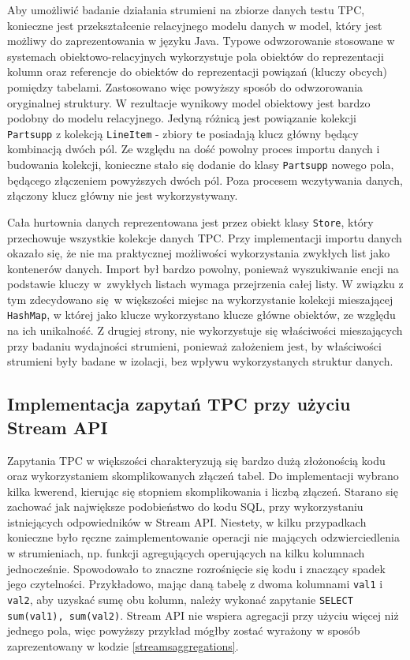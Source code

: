 \documentclass[12pt,twoside,openright]{extarticle}
\begin{document}
    Aby umożliwić badanie działania strumieni na zbiorze danych testu TPC, konieczne jest przekształcenie relacyjnego modelu danych w model, który jest możliwy do zaprezentowania w języku Java. Typowe odwzorowanie stosowane w systemach obiektowo-relacyjnych wykorzystuje pola obiektów do reprezentacji kolumn oraz referencje do obiektów do reprezentacji powiązań (kluczy obcych) pomiędzy tabelami. Zastosowano więc powyższy sposób do odwzorowania oryginalnej struktury. W rezultacje wynikowy model obiektowy jest bardzo podobny do modelu relacyjnego. Jedyną różnicą jest powiązanie kolekcji \texttt{Partsupp} z kolekcją \texttt{LineItem} - zbiory te posiadają klucz główny będący kombinacją dwóch pól. Ze względu na dość powolny proces importu danych i budowania kolekcji, konieczne stało się dodanie do klasy \texttt{Partsupp} nowego pola, będącego złączeniem powyższych dwóch pól. Poza procesem wczytywania danych, złączony klucz główny nie jest wykorzystywany.

    Cała hurtownia danych reprezentowana jest przez obiekt klasy \texttt{Store}, który przechowuje wszystkie kolekcje danych TPC. Przy implementacji importu danych okazało się, że nie ma praktycznej możliwości wykorzystania zwykłych list jako kontenerów danych. Import był bardzo powolny, ponieważ wyszukiwanie encji na podstawie kluczy w~zwykłych listach wymaga przejrzenia całej listy. W związku z tym zdecydowano się w większości miejsc na wykorzystanie kolekcji mieszającej \texttt{HashMap}, w której jako klucze wykorzystano klucze główne obiektów, ze względu na ich unikalność. Z drugiej strony, nie wykorzystuje się właściwości mieszających przy badaniu wydajności strumieni, ponieważ założeniem jest, by właściwości strumieni były badane w izolacji, bez wpływu wykorzystanych struktur danych.


\subsection{Implementacja zapytań TPC przy użyciu Stream API}

    Zapytania TPC w większości charakteryzują się bardzo dużą złożonością kodu oraz wykorzystaniem skomplikowanych złączeń tabel. Do implementacji wybrano kilka kwerend, kierując się stopniem skomplikowania i liczbą złączeń. Starano się zachować jak największe podobieństwo do kodu SQL, przy wykorzystaniu istniejących odpowiedników w Stream API. Niestety, w kilku przypadkach konieczne było ręczne zaimplementowanie operacji nie mających odzwierciedlenia w strumieniach, np. funkcji agregujących operujących na kilku kolumnach jednocześnie. Spowodowało to znaczne rozrośnięcie się kodu i znaczący spadek jego czytelności. Przykładowo, mając daną tabelę z dwoma kolumnami \texttt{val1} i \texttt{val2}, aby uzyskać sumę obu kolumn, należy wykonać zapytanie \texttt{SELECT sum(val1), sum(val2)}. Stream API nie wspiera agregacji przy użyciu więcej niż jednego pola, więc powyższy przykład mógłby zostać wyrażony w sposób zaprezentowany w kodzie \ref{streamsaggregations}.
\end{document}
